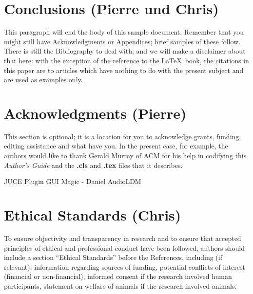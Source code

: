 \documentclass{nime-alternate} %
\begin{document}
\section{Conclusions (Pierre und Chris)}
This paragraph will end the body of this sample document.
Remember that you might still have Acknowledgments or
Appendices; brief samples of these
follow.  There is still the Bibliography to deal with; and
we will make a disclaimer about that here: with the exception
of the reference to the \LaTeX\ book, the citations in
this paper are to articles which have nothing to
do with the present subject and are used as
examples only.

\section{Acknowledgments (Pierre)}
This section is optional; it is a location for you
to acknowledge grants, funding, editing assistance and
what have you.  In the present case, for example, the
authors would like to thank Gerald Murray of ACM for
his help in codifying this \textit{Author's Guide}
and the \textbf{.cls} and \textbf{.tex} files that it describes.

JUCE
Plugin GUI Magic - Daniel
AudioLDM



\section{Ethical Standards (Chris)}
To ensure objectivity and transparency in research and to ensure that accepted principles of ethical and professional conduct have been followed, authors should include a section “Ethical Standards” before the References, including (if relevant): information regarding sources of funding, potential conflicts of interest (financial or non-financial), informed consent if the research involved human participants, statement on welfare of animals if the research involved animals.





%


	 


%
%
\appendix
\end{document}
